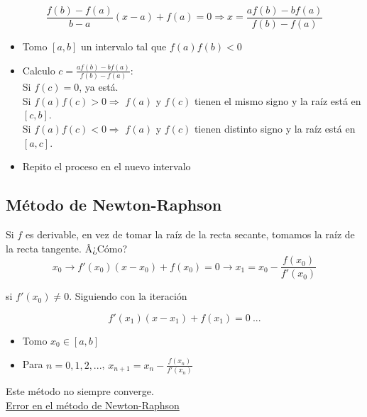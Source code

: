 $$\frac{f(b) - f(a)}{b - a}(x - a) + f(a) = 0 \Rightarrow x = \frac{af(b) - bf(a)}{f(b) - f(a)}$$

\begin{itemize}
    \item Tomo $[a, b]$ un intervalo tal que $f(a)f(b) < 0$

    \item Calculo $c = \frac{af(b) - bf(a)}{f(b) - f(a)}$:\\

    Si $f(c) = 0$, ya est\'a.\\
    
    Si $f(a)f(c) > 0 \Rightarrow$ $f(a)$ y $f(c)$ tienen el mismo signo y la ra\'iz est\'a en $[c, b]$.\\
    
    Si $f(a)f(c) < 0 \Rightarrow$ $f(a)$ y $f(c)$ tienen distinto signo y la ra\'iz est\'a en $[a, c]$.\\

    \item Repito el proceso en el nuevo intervalo
\end{itemize}

\subsection{M\'etodo de Newton-Raphson}

Si $f$ es derivable, en vez de tomar la ra\'iz de la recta secante, tomamos la ra\'iz de la recta tangente. Â¿C\'omo?\\

$$x_{0} \rightarrow f'(x_{0})(x - x_{0}) + f(x_{0}) = 0 \rightarrow x_{1} = x_{0} - \frac{f(x_{0})}{f'(x_{0})}$$

si $f'(x_{0}) \neq 0$. Siguiendo con la iteraci\'on

$$f'(x_{1})(x - x_{1}) + f(x_{1}) = 0\ ...$$

\begin{itemize}
    \item Tomo $x_{0} \in [a, b]$

    \item Para $n = 0, 1, 2, ...$, $x_{n + 1} = x_{n} - \frac{f(x_{n})}{f'(x_{n})}$
\end{itemize}

Este m\'etodo no siempre converge.\\

\underline{Error en el m\'etodo de Newton-Raphson}\\

